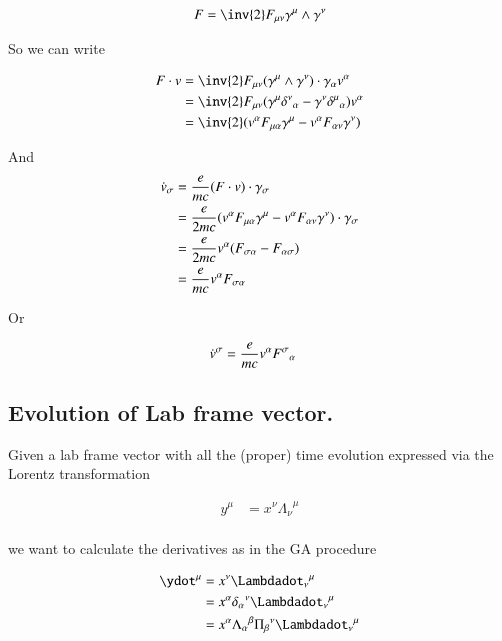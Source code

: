 \documentclass{article}
\newcommand{\ILambda}[0]{\Pi}
\begin{document}
\begin{align*}
F = \inv{2} F_{\mu\nu} \gamma^\mu \wedge \gamma^\nu
\end{align*}

So we can write

\begin{align*}
F \cdot v 
&= \inv{2} F_{\mu\nu} (\gamma^\mu \wedge \gamma^\nu) \cdot \gamma_\alpha v^\alpha \\
&= \inv{2} F_{\mu\nu} (\gamma^\mu {\delta^\nu}_\alpha - \gamma^\nu {\delta^\mu}_\alpha) v^\alpha \\
&= \inv{2} (v^\alpha F_{\mu\alpha} \gamma^\mu -v^\alpha F_{\alpha\nu} \gamma^\nu )
\end{align*}

And
\begin{align*}
\dot{v}_\sigma 
&= \frac{e}{m c} ( F \cdot v ) \cdot \gamma_\sigma \\
&= \frac{e}{2 m c} (v^\alpha F_{\mu\alpha} \gamma^\mu -v^\alpha F_{\alpha\nu} \gamma^\nu ) \cdot \gamma_\sigma \\
&= \frac{e}{2 m c} v^\alpha ( F_{\sigma\alpha} - F_{\alpha\sigma} ) \\
&= \frac{e}{m c} v^\alpha F_{\sigma\alpha} \\
\end{align*}

Or

\begin{align}
\dot{v}^\sigma &= \frac{e}{m c} v^\alpha {F^\sigma}_\alpha 
\end{align}

\subsection{ Evolution of Lab frame vector. }

Given a lab frame vector with all the (proper) time evolution expressed via the Lorentz transformation

\begin{align*}
y^\mu 
&= x^\nu {\Lambda_\nu}^\mu \\
\end{align*}

we want to calculate the derivatives as in the GA procedure

\begin{align*}
\ydot^\mu 
&= x^\nu {\Lambdadot_\nu}^\mu \\
&= x^\alpha {\delta_\alpha}^\nu {\Lambdadot_\nu}^\mu \\
&= x^\alpha {\Lambda_\alpha}^\beta {\ILambda_\beta}^\nu {\Lambdadot_\nu}^\mu \\
\end{align*}
\end{document}
